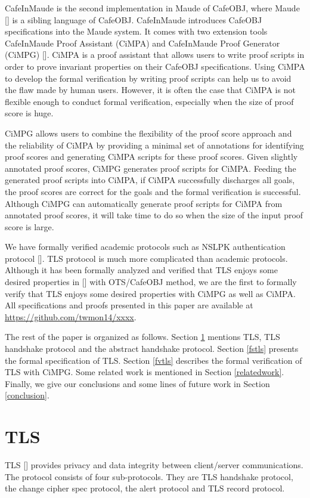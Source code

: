 \documentclass[a4paper,fleqn]{cas-dc}
\begin{document}
CafeInMaude is the second implementation in Maude of CafeOBJ, where Maude [\cite{ClavelEtal2007maude}] is a sibling language of CafeOBJ.
CafeInMaude introduces CafeOBJ specifications into the Maude system.
It comes with two extension tools CafeInMaude Proof Assistant (CiMPA) and CafeInMaude Proof Generator (CiMPG) [\cite{RiescoO18tosem}]. CiMPA is a proof assistant that allows users to write proof scripts in order to prove invariant properties on their CafeOBJ specifications. Using CiMPA to develop the formal verification by writing proof scripts can help us to avoid the flaw made by human users. However, it is often the case that CiMPA is not flexible enough to conduct formal verification, especially when the size of proof score is huge. 

CiMPG allows users to combine the flexibility of the proof score approach and the reliability of CiMPA by providing a minimal set of annotations for identifying proof scores and generating CiMPA scripts for these proof scores. Given slightly annotated proof scores, CiMPG generates proof scripts for CiMPA. Feeding the generated proof scripts into CiMPA, if CiMPA successfully discharges all goals, the proof scores are correct for the goals and the formal verification is successful. Although CiMPG can automatically generate proof scripts for CiMPA from annotated proof scores, it will take time to do so when the size of the input proof score is large.

We have formally verified academic protocols
such as NSLPK authentication protocol [\cite{twmon}]. TLS protocol is much more complicated than academic protocols. Although it has been formally analyzed and verified that TLS enjoys some desired properties in [\cite{1437139}] with OTS/CafeOBJ method, we are the first to formally verify that TLS enjoys some desired properties with CiMPG as  well as CiMPA. 
All specifications and proofs presented in this paper are available at \url{https://github.com/twmon14/xxxx}.

The rest of the paper is organized as follows. Section \ref{tls} mentions TLS, TLS handshake protocol and the abstract handshake protocol. Section \ref{fstls} presents the formal specification of TLS. Section \ref{fvtls} describes the formal verification of TLS with CiMPG. Some related work is mentioned in Section \ref{relatedwork}. Finally, we give our conclusions and some lines of future work in Section \ref{conclusion}.
	
\section{TLS}\label{tls}
TLS [\cite{dierk}] provides privacy and data integrity between client/server communications. The protocol consists of four sub-protocols. They are TLS handshake protocol, the change cipher spec protocol, the alert protocol and TLS record protocol. 
\end{document}
